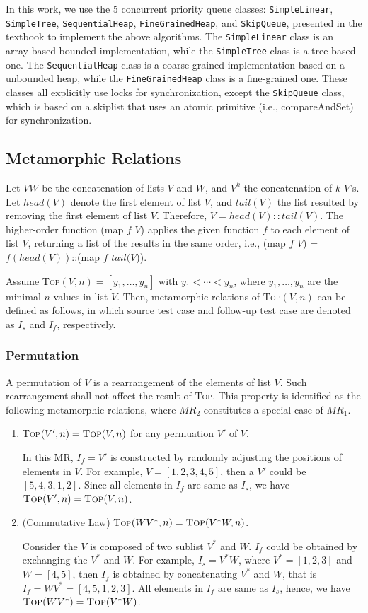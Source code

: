 \documentclass[conference]{IEEEtran}
\theoremstyle{remark}
\newcommand{\Fn}{\textsc{Top}}
\newcommand{\MR}{\textit{MR}}
\begin{document}
In this work, we use the 5 concurrent priority queue classes: \texttt{SimpleLinear}, \texttt{SimpleTree}, \texttt{SequentialHeap}, \texttt{FineGrainedHeap}, and \texttt{SkipQueue}, presented in the textbook \cite{PQUEUE} to implement the above algorithms. The \texttt{SimpleLinear} class is an array-based bounded implementation, while the \texttt{SimpleTree} class is a tree-based one. The \texttt{SequentialHeap} class is a coarse-grained implementation based on a unbounded heap, while the \texttt{FineGrainedHeap} class is a fine-grained one. These classes all explicitly use locks for synchronization, except the \texttt{SkipQueue} class, which is based on a skiplist that uses an atomic primitive (i.e., compareAndSet) for synchronization.

\subsection{Metamorphic Relations}
Let $VW$ be the concatenation of lists $V$ and $W$, and $V^k$ the concatenation of $k$ $V$'s. Let $head(V)$ denote the first element of list $V$, and $tail(V)$ the list resulted by removing the first element of list $V$. Therefore, $V=head(V)::tail(V)$. The higher-order function  (map $f$ $V$) applies the given function $f$ to each element of list $V$, returning a list of the results in the same order, i.e., (map $f$ $V$) = $f(head(V))$::(map $f$ $tail(V$)). 

Assume \Fn$(V,n)=[y_1,\ldots,y_n]$ with $y_1<\cdots< y_n$, where $y_1,\ldots,y_n$ are the minimal $n$ values in list $V$. Then, metamorphic relations of \Fn$(V,n)$ can be defined as follows, in which source test case and follow-up test case are denoted as $I_s$ and $I_f$, respectively.

\subsubsection{Permutation}
A permutation of $V$ is a rearrangement of the elements of list $V$. Such rearrangement shall not affect the result of \Fn. This property is identified as the following metamorphic relations, where $\MR_2$ constitutes a special case of $\MR_1$.
\begin{enumerate}[\MR-1]
\item \Fn$(V',n)=\Fn(V,n)$ for any permuation $V'$ of $V$.

In this MR, $I_f = V'$ is constructed by randomly adjusting the positions of elements in $V$. For example, $V = [1, 2, 3, 4, 5]$, then a $V'$ could be $[5, 4, 3, 1, 2]$. Since all elements in $I_f$ are same as $I_s$, we have $\Fn(V',n)=\Fn(V,n)$.

\item (Commutative Law) \Fn$(WV^*,n)=\Fn(V^*W,n)$.

Consider the $V$ is composed of two sublist $V^*$ and $W$. $I_f$ could be obtained by exchanging the $V^*$ and $W$. For example, $I_s = V^*W$, where $V^* = [1, 2, 3]$ and $W = [4, 5]$, then $I_f$ is obtained by concatenating $V^*$ and $W$, that is $I_f = WV^* = [4, 5, 1, 2, 3]$. All elements in $I_f$ are same as $I_s$, hence, we have $\Fn(WV^*) = \Fn(V^*W)$.
\end{enumerate}
\end{document}

